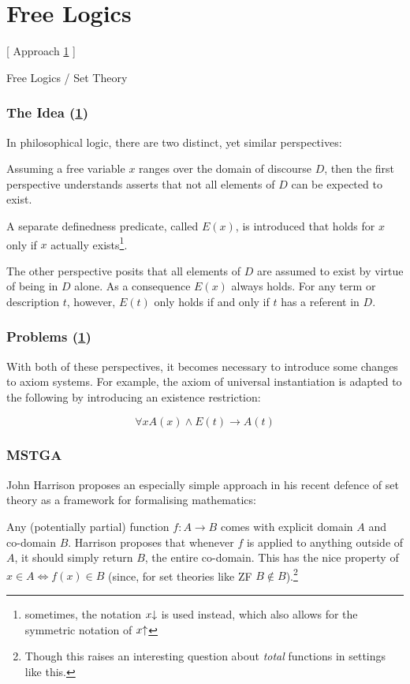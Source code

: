 \documentclass[aspectratio=169, usenames, dvipsnames]{beamer}
\newcommand{\defined}[1]{{#1}\mkern-5mu\downarrow}
\newcommand{\undefined}[1]{{#1}\mkern-5mu\uparrow}
\begin{document}
\section{Free Logics}\label{free}

\begin{frame}
\begin{center}
\Large [ Approach \ref{free} ]\bigskip

Free Logics / Set Theory\normalsize
\end{center}
\end{frame}

\begin{frame}
\frametitle{The Idea (\ref{free})}

In philosophical logic, there are two distinct, yet similar perspectives:
\bigskip

Assuming a free variable $x$ ranges over the domain of discourse $D$, then the first perspective understands asserts that not all elements of $D$ can be expected to exist.

A separate definedness predicate, called $E(x)$, is introduced that holds for $x$ only if $x$ actually exists\footnote{sometimes, the notation $\defined{x}$ is used instead, which also allows for the symmetric notation of $\undefined{x}$}.
\bigskip

The other perspective posits that all elements of $D$ are assumed to exist by virtue of being in $D$ alone. As a consequence $E(x)$ always holds. For any term or description $t$, however, $E(t)$ only holds if and only if $t$ has a referent in $D$.
\end{frame}

\begin{frame}
\frametitle{Problems (\ref{free})}
With both of these perspectives, it becomes necessary to introduce some changes to axiom systems. For example, the axiom of universal instantiation is adapted to the following by introducing an existence restriction:

$$\forall x A(x) \wedge E(t) \to A(t) $$
\end{frame}

\begin{frame}
\frametitle{MSTGA}
John Harrison proposes an especially simple approach in his recent defence of set theory as a framework for formalising mathematics:
\bigskip

Any (potentially partial) function $f : A \to B$ comes with explicit domain $A$ and co-domain $B$. Harrison proposes that whenever $f$ is applied to anything outside of $A$, it should simply return $B$, the entire co-domain. This has the nice property of $x \in A \iff f(x) \in B$ (since, for set theories like ZF $B \notin B$).\footnote{Though this raises an interesting question about \emph{total} functions in settings like this.}
\end{frame}
\end{document}
